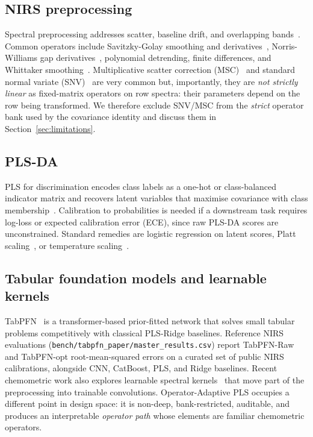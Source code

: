 \documentclass[review,a4paper]{elsarticle}
\newcommand{\PLS}{\textsc{PLS}\xspace}
\newcommand{\PLSDA}{\textsc{PLS-DA}\xspace}
\begin{document}
\subsection{NIRS preprocessing}
Spectral preprocessing addresses scatter, baseline drift, and
overlapping bands~\cite{rinnan2009review}. Common operators include
Savitzky-Golay smoothing and derivatives~\cite{savitzky1964smoothing},
Norris-Williams gap derivatives~\cite{norris1976influence}, polynomial
detrending, finite differences, and Whittaker
smoothing~\cite{eilers2003perfect}. Multiplicative scatter correction
(MSC)~\cite{geladi1985linearization} and standard normal variate
(SNV)~\cite{barnes1989standard} are very common but, importantly, they
are \emph{not strictly linear} as fixed-matrix operators on row spectra:
their parameters depend on the row being transformed. We therefore
exclude SNV/MSC from the \emph{strict} operator bank used by the
covariance identity and discuss them in Section~\ref{sec:limitations}.

\subsection{PLS-DA}
PLS for discrimination encodes class labels as a one-hot or
class-balanced indicator matrix and recovers latent variables that
maximise covariance with class
membership~\cite{barker2003plsda, indahl2007twostep, brereton2014plsda}.
Calibration to probabilities is needed if a downstream task requires
log-loss or expected calibration error (ECE), since raw \PLSDA scores
are unconstrained. Standard remedies are logistic regression on latent
scores, Platt scaling~\cite{platt1999probabilistic}, or temperature
scaling~\cite{guo2017calibration}.

\subsection{Tabular foundation models and learnable kernels}
TabPFN~\cite{hollmann2023tabpfn, hollmann2025tabpfn,
grinsztajn2025tabpfn25} is a transformer-based prior-fitted network
that solves small tabular problems competitively with classical
\PLS-Ridge baselines. Reference NIRS evaluations
(\verb|bench/tabpfn_paper/master_results.csv|) report TabPFN-Raw and
TabPFN-opt root-mean-squared errors on a curated set of public NIRS
calibrations, alongside CNN, CatBoost, \PLS, and Ridge baselines. Recent
chemometric work also explores learnable spectral
kernels~\cite{aompls2024fckpls} that move part of the preprocessing
into trainable convolutions. Operator-Adaptive \PLS occupies a
different point in design space: it is non-deep, bank-restricted,
auditable, and produces an interpretable \emph{operator path} whose
elements are familiar chemometric operators.
\end{document}
